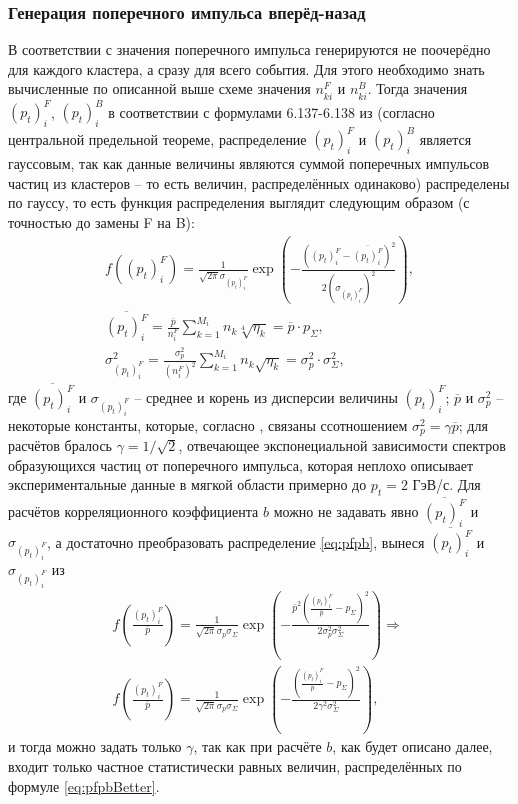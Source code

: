 \subsubsection{Генерация поперечного импульса вперёд-назад}
В соответствии с \cite{dissert} значения поперечного импульса генерируются не поочерёдно для каждого кластера, а сразу для всего события. 
Для этого необходимо знать вычисленные по описанной выше схеме значения $n^F_{ki}$ и $n^B_{ki}$. 
Тогда значения $(p_t)_i^F$, $(p_t)_i^B$ в соответствии с формулами 6.137-6.138 из \cite{dissert} (согласно центральной предельной теореме, распределение $(p_t)_i^F$ и $(p_t)_i^B$ является гауссовым, так как данные величины являются суммой поперечных импульсов частиц из кластеров -- то есть величин, распределённых одинаково) распределены по гауссу, то есть функция распределения выглядит следующим образом (с точностью до замены F на B):
\begin{equation} \label{eq:pfpb}
\begin{split}
	f((p_t)_i^F) = \frac{1}{\sqrt{2\pi} \sigma_{(p_t)_i^F}} \exp{\left( - \frac{((p_t)_i^F - \overline{(p_t)_i^F})^2}{2(\sigma_{(p_t)_i^F})^2} \right)}, \\
	\overline{(p_t)_i^F} = \frac{\overline{p}}{n_i^F} \sum_{k = 1}^{M_i} n_k \sqrt[4]{\eta_k} = \overline{p} \cdot p_\Sigma, \qquad \quad \quad \\
	\sigma_{(p_t)_i^F}^2 = \frac{\sigma_p^2}{(n_i^F)^2} \sum_{k = 1}^{M_i} n_k \sqrt{\eta_k} = \sigma_p^2 \cdot \sigma_\Sigma^2, \quad \quad \quad
\end{split}
\end{equation}
где $\overline{(p_t)_i^F}$ и $\sigma_{(p_t)_i^F}$ -- среднее и корень из дисперсии величины $(p_t)_i^F$; $\overline{p}$ и $\sigma_p^2$ -- некоторые константы, которые, согласно \cite{dissert}, связаны ссотношением $\sigma_p^2 = \gamma \overline{p}$; для расчётов бралось $\gamma = 1/\sqrt{2}$, отвечающее экспонециальной зависимости спектров образующихся частиц от поперечного импульса, которая неплохо описывает экспериментальные данные в мягкой области примерно до $p_t = 2$ ГэВ/с. 
Для расчётов корреляционного коэффициента $b$ можно не задавать явно $\overline{(p_t)_i^F}$ и $\sigma_{(p_t)_i^F}$, а достаточно преобразовать распределение \ref{eq:pfpb}, вынеся $\overline{(p_t)_i^F}$ и $\sigma_{(p_t)_i^F}$ из 
\begin{equation} \label{eq:pfpbBetter}
\begin{split}
	f \left( \frac{ (p_t)_i^F } { \overline{p} } \right) = \frac{1}{\sqrt{2 \pi} \sigma_p \sigma_\Sigma} \exp{ \left( - \frac{ \overline{p}^2 \left( \frac{ (p_t)_i^F }{ \overline{p} } - p_\Sigma \right)^2} { 2 \sigma_p^2 \sigma_\Sigma^2 } \right) } \Longrightarrow \\
	f \left( \frac{ (p_t)_i^F } { \overline{p} } \right) = \frac{1}{\sqrt{2 \pi} \sigma_p \sigma_\Sigma} \exp{ \left( - \frac{ \left( \frac{ (p_t)_i^F }{ \overline{p} } - p_\Sigma \right)^2} { 2 \gamma^2 \sigma_\Sigma^2 } \right) }, \quad \enspace \enspace
\end{split}
\end{equation}
и тогда можно задать только $\gamma$, так как при расчёте $b$, как будет описано далее, входит только частное статистически равных величин, распределённых по формуле \ref{eq:pfpbBetter}.
